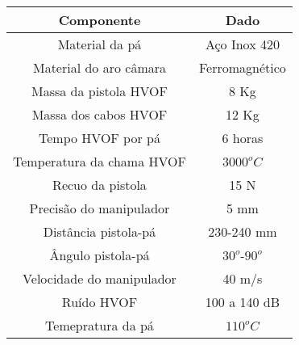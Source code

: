 \begin{center}
\begin{tabular}{  c | c  }
  \hline
  \textbf{Componente} & \textbf{Dado} \\ \hline
  Material da pá & Aço Inox 420 \\ \hline
  Material do aro câmara & Ferromagnético  \\ \hline
  Massa da pistola HVOF & 8 Kg  \\ \hline
  Massa dos cabos HVOF & 12 Kg  \\ \hline
  Tempo HVOF por pá & 6 horas \\ \hline
  Temperatura da chama HVOF & $3000^oC$ \\ \hline
  Recuo da pistola & 15 N \\ \hline
  Precisão do manipulador& 5 mm \\ \hline
  Distância pistola-pá & 230-240 mm \\ \hline
  Ângulo pistola-pá & $30^o$-$90^o$ \\ \hline
  Velocidade do manipulador & 40 m/s \\ \hline
  Ruído HVOF & 100 a 140 dB \\ \hline
  Temepratura da pá & $110^oC$ \\
  \hline
\end{tabular}
\label{tab::hvof}
\end{center}



